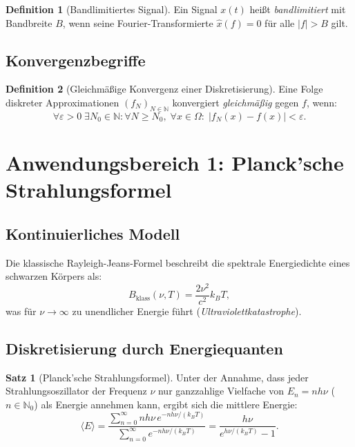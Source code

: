 ﻿\documentclass[a4paper,12pt]{article}
\theoremstyle{definition}
\newtheorem{definition}{Definition}
\newtheorem{satz}{Satz}
\begin{document}
\begin{definition}[Bandlimitiertes Signal]
    Ein Signal $x(t)$ heißt \emph{bandlimitiert} mit Bandbreite $B$, wenn seine Fourier-Transformierte $\hat{x}(f) = 0$ für alle $|f| > B$ gilt.
\end{definition}

\subsection{Konvergenzbegriffe}

\begin{definition}[Gleichmäßige Konvergenz einer Diskretisierung]
    Eine Folge diskreter Approximationen $(f_N)_{N\in\mathbb{N}}$ konvergiert \emph{gleichmäßig} gegen $f$, wenn:
    \[
    \forall \varepsilon > 0\;\exists N_0 \in \mathbb{N} : \forall N \geq N_0,\;\forall x \in \Omega:\;|f_N(x) - f(x)| < \varepsilon.
    \]
\end{definition}

\section{Anwendungsbereich 1: Planck'sche Strahlungsformel}

\subsection{Kontinuierliches Modell}

Die klassische Rayleigh-Jeans-Formel beschreibt die spektrale Energiedichte eines schwarzen Körpers als:
\[
B_{\text{klass}}(\nu, T) = \frac{2\nu^2}{c^2} k_B T,
\]
was für $\nu \to \infty$ zu unendlicher Energie führt (\emph{Ultraviolettkatastrophe}).

\subsection{Diskretisierung durch Energiequanten}

\begin{satz}[Planck'sche Strahlungsformel]
    Unter der Annahme, dass jeder Strahlungsoszillator der Frequenz $\nu$ nur ganzzahlige Vielfache von $E_n = n h \nu$ ($n \in \mathbb{N}_0$) als Energie annehmen kann, ergibt sich die mittlere Energie:
    \[
    \langle E \rangle = \frac{\sum_{n=0}^\infty n h\nu \, e^{-nh\nu/(k_BT)}}{\sum_{n=0}^\infty e^{-nh\nu/(k_BT)}} = \frac{h\nu}{e^{h\nu/(k_BT)} - 1}.
    \]
\end{satz}
\end{document}
